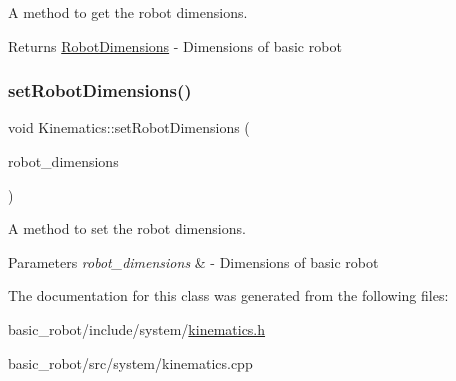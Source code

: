 A method to get the robot dimensions. 

\begin{DoxyReturn}{Returns}
\hyperlink{structRobotDimensions}{Robot\+Dimensions} -\/ Dimensions of basic robot 
\end{DoxyReturn}
\mbox{\label{classKinematics_aee778602a6079e9ac4db804b6b3e4547}} 
\subsubsection{\texorpdfstring{set\+Robot\+Dimensions()}{setRobotDimensions()}}
{\footnotesize\ttfamily void Kinematics\+::set\+Robot\+Dimensions (\begin{DoxyParamCaption}\item[{const \hyperlink{structRobotDimensions}{Robot\+Dimensions} \&}]{robot\+\_\+dimensions }\end{DoxyParamCaption})}



A method to set the robot dimensions. 


\begin{DoxyParams}{Parameters}
{\em robot\+\_\+dimensions} & -\/ Dimensions of basic robot \\
\hline
\end{DoxyParams}


The documentation for this class was generated from the following files\+:\begin{DoxyCompactItemize}
\item 
basic\+\_\+robot/include/system/\hyperlink{kinematics_8h}{kinematics.\+h}\item 
basic\+\_\+robot/src/system/kinematics.\+cpp\end{DoxyCompactItemize}
